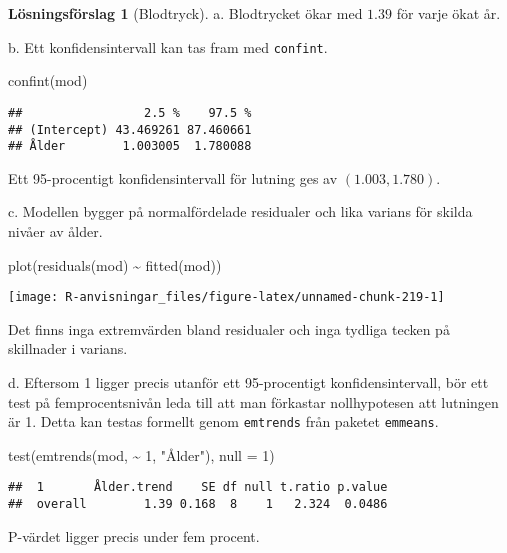 \documentclass[
]{book}
\newenvironment{Shaded}{\begin{snugshade}}{\end{snugshade}}
\newcommand{\AttributeTok}[1]{\textcolor[rgb]{0.77,0.63,0.00}{#1}}
\newcommand{\DecValTok}[1]{\textcolor[rgb]{0.00,0.00,0.81}{#1}}
\newcommand{\FunctionTok}[1]{\textcolor[rgb]{0.00,0.00,0.00}{#1}}
\newcommand{\NormalTok}[1]{#1}
\newcommand{\SpecialCharTok}[1]{\textcolor[rgb]{0.00,0.00,0.00}{#1}}
\newcommand{\StringTok}[1]{\textcolor[rgb]{0.31,0.60,0.02}{#1}}
\theoremstyle{definition}
\theoremstyle{definition}
\theoremstyle{definition}
\theoremstyle{definition}
\newtheorem{hypothesis}{Lösningsförslag}[chapter]
\theoremstyle{remark}
\begin{document}
\begin{hypothesis}[Blodtryck]
a. Blodtrycket ökar med \(1.39\) för varje ökat år.

b. Ett konfidensintervall kan tas fram med \texttt{confint}.

\begin{Shaded}
\begin{Highlighting}[]
\FunctionTok{confint}\NormalTok{(mod)}
\end{Highlighting}
\end{Shaded}

\begin{verbatim}
##                 2.5 %    97.5 %
## (Intercept) 43.469261 87.460661
## Ålder        1.003005  1.780088
\end{verbatim}

Ett 95-procentigt konfidensintervall för lutning ges av \((1.003, 1.780)\).

c. Modellen bygger på normalfördelade residualer och lika varians för skilda nivåer av ålder.

\begin{Shaded}
\begin{Highlighting}[]
\FunctionTok{plot}\NormalTok{(}\FunctionTok{residuals}\NormalTok{(mod) }\SpecialCharTok{\textasciitilde{}} \FunctionTok{fitted}\NormalTok{(mod))}
\end{Highlighting}
\end{Shaded}

\begin{center}\texttt{[image: R-anvisningar\_files/figure-latex/unnamed-chunk-219-1]} \end{center}

Det finns inga extremvärden bland residualer och inga tydliga tecken på skillnader i varians.

d. Eftersom 1 ligger precis utanför ett 95-procentigt konfidensintervall, bör ett test på femprocentsnivån leda till att man förkastar nollhypotesen att lutningen är 1. Detta kan testas formellt genom \texttt{emtrends} från paketet \texttt{emmeans}.

\begin{Shaded}
\begin{Highlighting}[]
\FunctionTok{test}\NormalTok{(}\FunctionTok{emtrends}\NormalTok{(mod, }\SpecialCharTok{\textasciitilde{}} \DecValTok{1}\NormalTok{, }\StringTok{"Ålder"}\NormalTok{), }\AttributeTok{null =} \DecValTok{1}\NormalTok{)}
\end{Highlighting}
\end{Shaded}

\begin{verbatim}
##  1       Ålder.trend    SE df null t.ratio p.value
##  overall        1.39 0.168  8    1   2.324  0.0486
\end{verbatim}

P-värdet ligger precis under fem procent.
\end{hypothesis}
\end{document}
